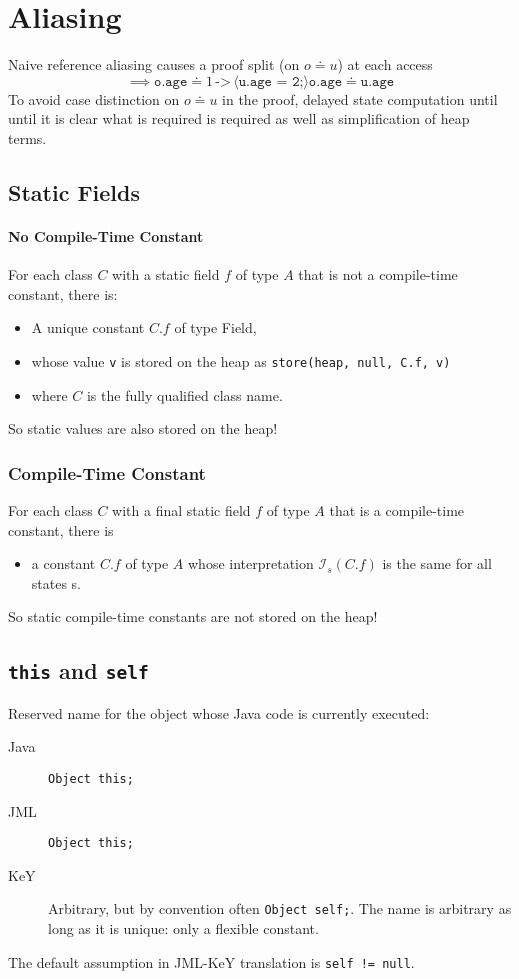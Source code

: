 		\section{Aliasing}
			Naive reference aliasing causes a proof split (on \( o \doteq u \)) at each access
			\begin{equation*}
				\implies \texttt{o.age} \doteq 1 \,\texttt{->}\, \langle \texttt{u.age = 2;} \rangle \texttt{o.age} \doteq \texttt{u.age}
			\end{equation*}
			To avoid case distinction on \( o \doteq u \) in the proof, delayed state computation until until it is clear what is required is required as well as simplification of heap terms.
		
		\subsection{Static Fields}
			\paragraph{No Compile-Time Constant}
				For each class \(C\) with a static field \(f\) of type \(A\) that is not a compile-time constant, there is:
				\begin{itemize}
					\item A unique constant \( C.f \) of type Field,
					\item whose value \texttt{v} is stored on the heap as \texttt{store(heap, null, C.f, v)}
					\item where \(C\) is the fully qualified class name.
				\end{itemize}
				So static values are also stored on the heap!
			
			\subsubsection{Compile-Time Constant}
				For each class \(C\) with a final static field \(f\) of type \(A\) that is a compile-time constant, there is
				\begin{itemize}
					\item a constant \(C.f\) of type \(A\) whose interpretation \( \mathcal{I}_s(C.f) \) is the same for all states s.
				\end{itemize}
				So static compile-time constants are not stored on the heap!
		
		\subsection{\texttt{this} and \texttt{self}}
			Reserved name for the object whose Java code is currently executed:
			\begin{description}
				\item[Java] \texttt{Object this;}
				\item[JML]  \texttt{Object this;}
				\item[KeY]  Arbitrary, but by convention often \texttt{Object self;}. The name is arbitrary as long as it is unique: only a flexible constant.
			\end{description}
			The default assumption in JML-KeY translation is \texttt{self != null}.
		
